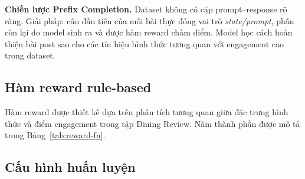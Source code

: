 \textbf{Chiến lược Prefix Completion.} Dataset không có cặp
prompt--response rõ ràng. Giải pháp: câu đầu tiên của mỗi bài thực
đóng vai trò \emph{state/prompt}, phần còn lại do model sinh ra và
được hàm reward chấm điểm. Model học cách hoàn thiện bài post sao
cho các tín hiệu hình thức tương quan với engagement cao trong dataset.

\subsection{Hàm reward rule-based}

Hàm reward được thiết kế dựa trên phân tích tương quan giữa đặc trưng
hình thức và điểm engagement trong tập Dining Review. Năm thành phần
được mô tả trong Bảng~\ref{tab:reward-fn}.

\begin{table}[htbp]
  \centering
  \small
  \caption{Năm thành phần hàm reward rule-based và điểm số tương ứng.}
  \label{tab:reward-fn}
\end{table}

\subsection{Cấu hình huấn luyện}

